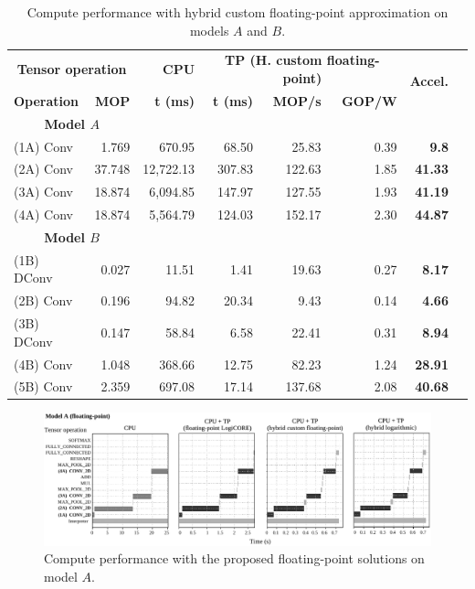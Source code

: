 \begin{table}[!htp]\centering
	\caption{Compute performance with hybrid custom floating-point approximation on models $A$ and $B$.}\label{tab:performace_float_hybrid}
	\scriptsize
\begin{tabular}{lrrrrrrr}\toprule
	\multicolumn{2}{c}{\textbf{Tensor operation}} &\textbf{CPU} &\multicolumn{3}{c}{\textbf{TP (H. custom floating-point)}} &\multirow{2}{*}{\textbf{Accel.}} \\\cmidrule{1-6}
	\textbf{Operation} &\textbf{MOP} &\textbf{t (ms)} &\textbf{t (ms)} &\textbf{MOP/s} &\textbf{GOP/W} & \\\midrule
	\multicolumn{2}{c}{\textbf{Model $A$}} & & & & & \\
	(1A) Conv &1.769 &670.95 &68.50 &25.83 &0.39 &\textbf{9.8} \\
	(2A) Conv &37.748 &12,722.13 &307.83 &122.63 &1.85 &\textbf{41.33} \\
	(3A) Conv &18.874 &6,094.85 &147.97 &127.55 &1.93 &\textbf{41.19} \\
	(4A) Conv &18.874 &5,564.79 &124.03 &152.17 &2.30 &\textbf{44.87} & \\\midrule
	\multicolumn{2}{c}{\textbf{Model $B$}} & & & & & \\
	(1B) DConv &0.027 &11.51 &1.41 &19.63 &0.27 &\textbf{8.17} \\
	(2B) Conv &0.196 &94.82 &20.34 &9.43 &0.14 &\textbf{4.66} \\
	(3B) DConv &0.147 &58.84 &6.58 &22.41 &0.31 &\textbf{8.94} \\
	(4B) Conv &1.048 &368.66 &12.75 &82.23 &1.24 &\textbf{28.91} \\
	(5B) Conv &2.359 &697.08 &17.14 &137.68 &2.08 &\textbf{40.68} \\
	\bottomrule
\end{tabular}
\end{table}


\begin{figure}[t!]
	\centering
	\includegraphics[width=\textwidth]{../figures/sched_A_float_all.pdf}
	\caption{Compute performance with the proposed floating-point solutions on model $A$.}
	\label{fig:sched_model_a_float}
\end{figure}


